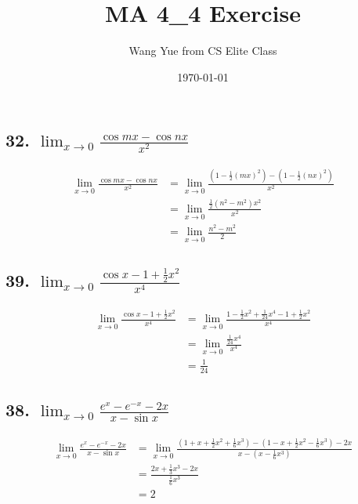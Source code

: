\documentclass{article}
\begin{document}
    \title{MA 4\_4 Exercise}
    \author{Wang Yue from CS Elite Class}
    \date{\today}

    \maketitle

    \subsection*{32. $\lim_{x \to 0}\frac{\cos mx - \cos nx}{x^2}$}

    $$\begin{aligned}
        \lim_{x \to 0}\frac{\cos mx - \cos nx}{x^2} &= \lim_{x \to 0} \frac{(1 - \frac 1 2 (mx)^2) - (1 - \frac 1 2 (nx)^2)}{x^2} \\
        &= \lim_{x \to 0}\frac{\frac 1 2(n^2 - m^2)x^2}{x^2} \\
        &= \lim_{x \to 0}\frac{n^2 - m^2}{2}
    \end{aligned}$$

    \subsection*{39. $\lim_{x \to 0}\frac{\cos x - 1 + \frac 1 2 x^2}{x^4}$}

    $$\begin{aligned}
        \lim_{x \to 0}\frac{\cos x - 1 + \frac 1 2 x^2}{x^4} &= \lim_{x \to 0}\frac{1 - \frac 1 2 x^2 + \frac{1}{24} x^4 - 1 + \frac 1 2 x^2}{x^4} \\
        &= \lim_{x \to 0}\frac{\frac{1}{24} x^4}{x^4} \\
        &= \frac{1}{24}
    \end{aligned}$$

    \subsection*{38. $\lim_{x \to 0}\frac{e^x - e^{-x} - 2x}{x - \sin x}$}

    $$\begin{aligned}
        \lim_{x \to 0}\frac{e^x - e^{-x} - 2x}{x - \sin x} &= \lim_{x \to 0}\frac{(1 + x + \frac 1 2 x^2 + \frac 1 6 x^3) - (1 - x + \frac 1 2 x^2 - \frac 1 6 x^3) - 2x}{x - (x - \frac{1}{6}x^3)} \\
        &= \frac{2x + \frac 1 3 x^3 - 2x}{\frac 1 6 x^3} \\
        &= 2
    \end{aligned}$$
\end{document}
